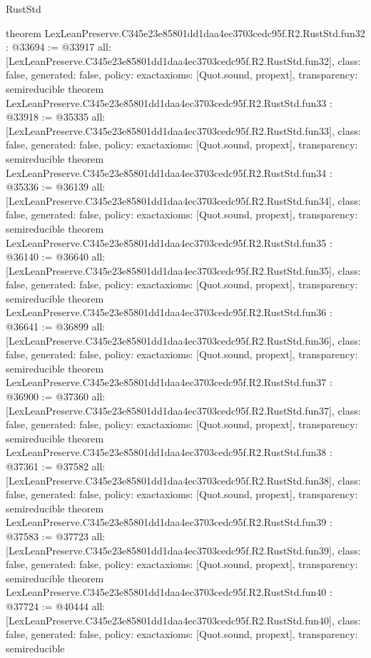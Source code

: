 \begin{lexlean}{RustStd}
\begin{coremodule}
{}
theorem LexLeanPreserve.C345e23e85801dd1daa4ec3703cedc95f.R2.RustStd.fun32 : @33694 := @33917 {
  all: [LexLeanPreserve.C345e23e85801dd1daa4ec3703cedc95f.R2.RustStd.fun32],
  class: false,
  generated: false,
  policy: exact{axioms: [Quot.sound, propext]},
  transparency: semireducible
}
theorem LexLeanPreserve.C345e23e85801dd1daa4ec3703cedc95f.R2.RustStd.fun33 : @33918 := @35335 {
  all: [LexLeanPreserve.C345e23e85801dd1daa4ec3703cedc95f.R2.RustStd.fun33],
  class: false,
  generated: false,
  policy: exact{axioms: [Quot.sound, propext]},
  transparency: semireducible
}
theorem LexLeanPreserve.C345e23e85801dd1daa4ec3703cedc95f.R2.RustStd.fun34 : @35336 := @36139 {
  all: [LexLeanPreserve.C345e23e85801dd1daa4ec3703cedc95f.R2.RustStd.fun34],
  class: false,
  generated: false,
  policy: exact{axioms: [Quot.sound, propext]},
  transparency: semireducible
}
theorem LexLeanPreserve.C345e23e85801dd1daa4ec3703cedc95f.R2.RustStd.fun35 : @36140 := @36640 {
  all: [LexLeanPreserve.C345e23e85801dd1daa4ec3703cedc95f.R2.RustStd.fun35],
  class: false,
  generated: false,
  policy: exact{axioms: [Quot.sound, propext]},
  transparency: semireducible
}
theorem LexLeanPreserve.C345e23e85801dd1daa4ec3703cedc95f.R2.RustStd.fun36 : @36641 := @36899 {
  all: [LexLeanPreserve.C345e23e85801dd1daa4ec3703cedc95f.R2.RustStd.fun36],
  class: false,
  generated: false,
  policy: exact{axioms: [Quot.sound, propext]},
  transparency: semireducible
}
theorem LexLeanPreserve.C345e23e85801dd1daa4ec3703cedc95f.R2.RustStd.fun37 : @36900 := @37360 {
  all: [LexLeanPreserve.C345e23e85801dd1daa4ec3703cedc95f.R2.RustStd.fun37],
  class: false,
  generated: false,
  policy: exact{axioms: [Quot.sound, propext]},
  transparency: semireducible
}
theorem LexLeanPreserve.C345e23e85801dd1daa4ec3703cedc95f.R2.RustStd.fun38 : @37361 := @37582 {
  all: [LexLeanPreserve.C345e23e85801dd1daa4ec3703cedc95f.R2.RustStd.fun38],
  class: false,
  generated: false,
  policy: exact{axioms: [Quot.sound, propext]},
  transparency: semireducible
}
theorem LexLeanPreserve.C345e23e85801dd1daa4ec3703cedc95f.R2.RustStd.fun39 : @37583 := @37723 {
  all: [LexLeanPreserve.C345e23e85801dd1daa4ec3703cedc95f.R2.RustStd.fun39],
  class: false,
  generated: false,
  policy: exact{axioms: [Quot.sound, propext]},
  transparency: semireducible
}
theorem LexLeanPreserve.C345e23e85801dd1daa4ec3703cedc95f.R2.RustStd.fun40 : @37724 := @40444 {
  all: [LexLeanPreserve.C345e23e85801dd1daa4ec3703cedc95f.R2.RustStd.fun40],
  class: false,
  generated: false,
  policy: exact{axioms: [Quot.sound, propext]},
  transparency: semireducible
}
\end{coremodule}
\end{lexlean}
